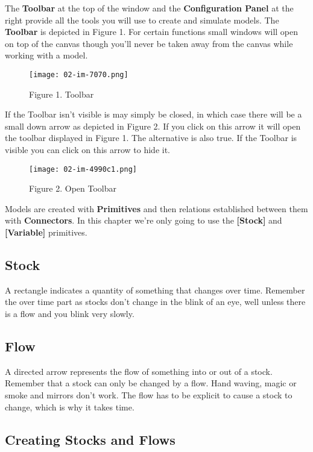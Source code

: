 \documentclass[]{memoir}
\makeatletter
\def\maxwidth{\ifdim\Gin@nat@width>\linewidth\linewidth
\else\Gin@nat@width\fi}
\let\Oldincludegraphics\includegraphics
\renewcommand{\includegraphics}[1]{\Oldincludegraphics[width=\maxwidth]{#1}}
\newcommand{\p}[1]{\textbf{{[}#1{]}}}
\renewcommand{\u}[1]{\textbf{#1}}
\makeatother
\begin{document}
The \u{Toolbar} at the top of the window and the \u{Configuration Panel}
at the right provide all the tools you will use to create and simulate
models. The \u{Toolbar} is depicted in Figure 1. For certain functions
small windows will open on top of the canvas though you'll never be
taken away from the canvas while working with a model.

\begin{figure}[htbp]
\centering
\texttt{[image: 02-im-7070.png]}
\caption{Figure 1. Toolbar}
\end{figure}

If the Toolbar isn't visible is may simply be closed, in which case
there will be a small down arrow as depicted in Figure 2. If you click
on this arrow it will open the toolbar displayed in Figure 1. The
alternative is also true. If the Toolbar is visible you can click on
this arrow to hide it.

\begin{figure}[htbp]
\centering
\texttt{[image: 02-im-4990c1.png]}
\caption{Figure 2. Open Toolbar}
\end{figure}

Models are created with \u{Primitives} and then relations established
between them with \u{Connectors}. In this chapter we're only going to
use the \p{Stock} and \p{Variable} primitives.

\subsection{Stock}

A rectangle indicates a quantity of something that changes over time.
Remember the over time part as stocks don't change in the blink of an
eye, well unless there is a flow and you blink very slowly.

\subsection{Flow}

A directed arrow represents the flow of something into or out of a
stock. Remember that a stock can only be changed by a flow. Hand waving,
magic or smoke and mirrors don't work. The flow has to be explicit to
cause a stock to change, which is why it takes time.

\subsection{Creating Stocks and Flows}
\end{document}
